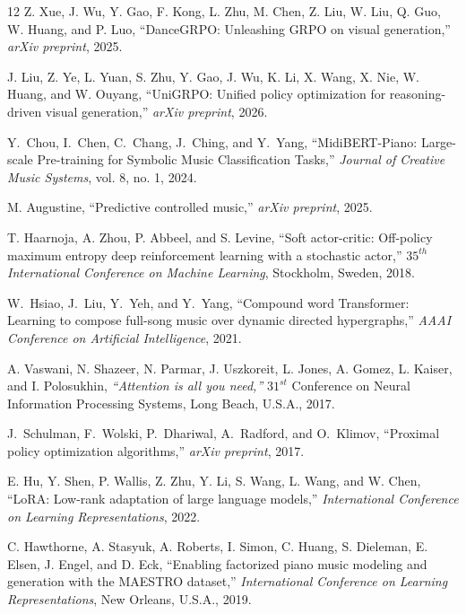 \documentclass[letterpaper, 10 pt, conference]{ieeeconf}
\begin{document}
\begin{thebibliography}{12}
Z. Xue, J. Wu, Y. Gao, F. Kong, L. Zhu, M. Chen, Z. Liu, W. Liu, Q. Guo, W. Huang, and P. Luo,
``DanceGRPO: Unleashing GRPO on visual generation,''
\emph{arXiv preprint}, 2025.

J. Liu, Z. Ye, L. Yuan, S. Zhu, Y. Gao, J. Wu, K. Li, X. Wang, X. Nie, W. Huang, and W. Ouyang,
``UniGRPO: Unified policy optimization for reasoning-driven visual generation,''
\emph{arXiv preprint}, 2026.


Y.~Chou, I.~Chen, C.~Chang, J.~Ching, and Y.~Yang,
``MidiBERT-Piano: Large-scale Pre-training for Symbolic Music Classification Tasks,''
\emph{Journal of Creative Music Systems}, vol. 8, no. 1, 2024.

M. Augustine,
``Predictive controlled music,''
\emph{arXiv preprint}, 2025.

T. Haarnoja, A. Zhou, P. Abbeel, and S. Levine,
``Soft actor-critic: Off-policy maximum entropy deep reinforcement learning with a stochastic actor,''
 \emph{ $35^{th}$ International Conference on Machine Learning}, Stockholm, Sweden, 2018.

W.~Hsiao, J.~Liu, Y.~Yeh, and Y.~Yang,
``Compound word Transformer: Learning to compose full-song music over dynamic directed hypergraphs,''
\emph{AAAI Conference on Artificial Intelligence}, 2021.


 A. Vaswani, N. Shazeer, N. Parmar, J. Uszkoreit, L. Jones, A. Gomez, L. Kaiser, and I. Polosukhin, \emph{\textquotedblleft Attention is all you need,\textquotedblright}   
  $31^{st}$ Conference on Neural Information Processing Systems, Long Beach, U.S.A., 2017.

J.~Schulman, F.~Wolski, P.~Dhariwal, A.~Radford, and O.~Klimov,
``Proximal policy optimization algorithms,''
\emph{arXiv preprint}, 2017.



E. Hu, Y. Shen, P. Wallis, Z. Zhu, Y. Li, S. Wang, L. Wang, and W. Chen,
``LoRA: Low-rank adaptation of large language models,''
\emph{International Conference on Learning Representations}, 2022.

C. Hawthorne, A. Stasyuk, A. Roberts, I. Simon, C. Huang, S. Dieleman, E. Elsen, J. Engel, and D. Eck,
``Enabling factorized piano music modeling and generation with the MAESTRO dataset,''
\emph{International Conference on Learning Representations}, New Orleans, U.S.A., 2019.



\end{thebibliography}
\end{document}
